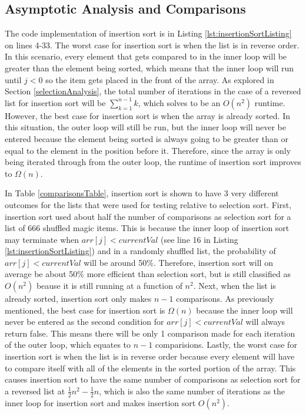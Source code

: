 \documentclass[letterpaper, 10pt,DIV=13]{scrartcl}
\numberwithin{equation}{section} %
\numberwithin{figure}{section} %
\numberwithin{table}{section} %
\begin{document}
\subsection{Asymptotic Analysis and Comparisons}\label{insertionAnalysis}
The code implementation of insertion sort is in Listing \ref{lst:insertionSortListing} on lines 4-33. The worst case for insertion sort is when the list is in reverse order. In this scenario, every element that gets compared to in the inner loop will be greater than the element being sorted, which means that the inner loop will run until $j < 0$ so the item gets placed in the front of the array. As explored in Section \ref{selectionAnalysis}, the total number of iterations in the case of a reversed list for insertion sort will be $\sum_{k = 1} ^{n - 1} k$, which solves to be an $O(n^2)$ runtime. However, the best case for insertion sort is when the array is already sorted. In this situation, the outer loop will still be run, but the inner loop will never be entered because the element being sorted is always going to be greater than or equal to the element in the position before it. Therefore, since the array is only being iterated through from the outer loop, the runtime of insertion sort improves to $\Omega(n)$.

In Table \ref{comparisonsTable}, insertion sort is shown to have 3 very different outcomes for the lists that were used for testing relative to selection sort. First, insertion sort used about half the number of comparisons as selection sort for a list of 666 shuffled magic items. This is because the inner loop of insertion sort may terminate when $arr[j] < currentVal$ (see line 16 in Listing \ref{lst:insertionSortListing}) and in a randomly shuffled list, the probability of $arr[j] < currentVal$ will be around 50\%. Therefore, insertion sort will on average be about 50\% more efficient than selection sort, but is still classified as $O(n^2)$ beause it is still running at a function of $n^2$. Next, when the list is already sorted, insertion sort only makes $n-1$ comparisons. As previously mentioned, the best case for insertion sort is $\Omega(n)$ because the inner loop will never be entered as the second condition for $arr[j] < currentVal$ will always return false. This means there will be only 1 comparison made for each iteration of the outer loop, which equates to $n - 1$ comparisions. Lastly, the worst case for insertion sort is when the list is in reverse order because every element will have to compare itself with all of the elements in the sorted portion of the array. This causes insertion sort to have the same number of comparisons as selection sort for a reversed list at $\frac{1}{2}n^2 - \frac{1}{2}n$, which is also the same number of iterations as the inner loop for insertion sort and makes insertion sort $O(n^2)$.
\end{document}
